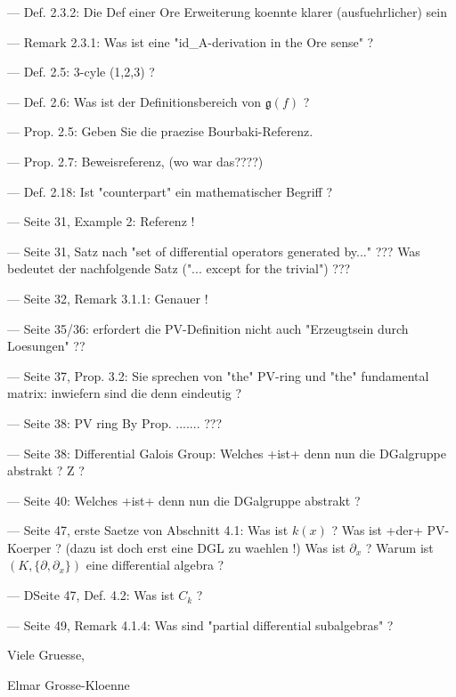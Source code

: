 --- Def. 2.3.2: Die Def einer Ore Erweiterung koennte klarer
(ausfuehrlicher) sein

--- Remark 2.3.1: Was ist eine "id_A-derivation in the Ore sense" ?

--- Def. 2.5: 3-cyle (1,2,3) ?

--- Def. 2.6: Was ist der Definitionsbereich von ${\mathfrak g}(f)$ ?

--- Prop. 2.5: Geben Sie die praezise Bourbaki-Referenz.

--- Prop. 2.7: Beweisreferenz, (wo war das????)

--- Def. 2.18: Ist "counterpart" ein mathematischer Begriff ?

--- Seite 31, Example 2: Referenz !

--- Seite 31, Satz nach "set of differential operators generated by..."
??? Was bedeutet der nachfolgende Satz ("... except for the trivial") ???

--- Seite 32, Remark 3.1.1: Genauer !

--- Seite 35/36: erfordert die PV-Definition nicht auch "Erzeugtsein durch
Loesungen" ??

--- Seite 37, Prop. 3.2: Sie sprechen von "the" PV-ring und "the"
fundamental matrix: inwiefern sind die denn eindeutig ?

--- Seite 38: PV ring By Prop. ....... ???

--- Seite 38: Differential Galois Group: Welches +ist+ denn nun die
DGalgruppe abstrakt ? Z ?

--- Seite 40: Welches +ist+ denn nun die DGalgruppe abstrakt ?

--- Seite 47, erste Saetze von Abschnitt 4.1: Was ist $k(x)$ ? Was ist
+der+ PV-Koerper ? (dazu ist doch erst eine DGL zu waehlen !) Was ist
$\partial_x$ ? Warum ist $(K,\{\partial, \partial_x\})$ eine differential
algebra ?

--- DSeite 47, Def. 4.2: Was ist $C_k$ ?

--- Seite 49, Remark 4.1.4: Was sind "partial differential subalgebras" ?

Viele Gruesse,

Elmar Grosse-Kloenne


